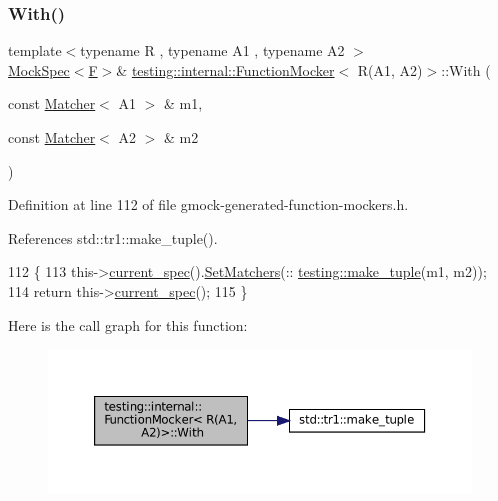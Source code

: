 \subsubsection{\texorpdfstring{With()}{With()}}
{\footnotesize\ttfamily template$<$typename R , typename A1 , typename A2 $>$ \\
\hyperlink{classtesting_1_1internal_1_1MockSpec}{Mock\+Spec}$<$\hyperlink{classtesting_1_1internal_1_1FunctionMocker_3_01R_07A1_00_01A2_08_4_a61302610bfc9b30588ea345e468310b2}{F}$>$\& \hyperlink{classtesting_1_1internal_1_1FunctionMocker}{testing\+::internal\+::\+Function\+Mocker}$<$ R(A1, A2)$>$\+::With (\begin{DoxyParamCaption}\item[{const \hyperlink{classtesting_1_1Matcher}{Matcher}$<$ A1 $>$ \&}]{m1,  }\item[{const \hyperlink{classtesting_1_1Matcher}{Matcher}$<$ A2 $>$ \&}]{m2 }\end{DoxyParamCaption})\hspace{0.3cm}{\ttfamily [inline]}}



Definition at line 112 of file gmock-\/generated-\/function-\/mockers.\+h.



References std\+::tr1\+::make\+\_\+tuple().


\begin{DoxyCode}
112                                                                   \{
113     this->\hyperlink{classtesting_1_1internal_1_1FunctionMockerBase_a744318106e20b346f4f1efbf5a601644}{current\_spec}().\hyperlink{classtesting_1_1internal_1_1MockSpec_a6b4fd303136c6282b19ddb16100f02a2}{SetMatchers}(::
      \hyperlink{namespacestd_1_1tr1_af7e12a0f5b5791b5b7c49a5a17b85359}{testing::make\_tuple}(m1, m2));
114     \textcolor{keywordflow}{return} this->\hyperlink{classtesting_1_1internal_1_1FunctionMockerBase_a744318106e20b346f4f1efbf5a601644}{current\_spec}();
115   \}
\end{DoxyCode}
Here is the call graph for this function\+:
\nopagebreak
\begin{figure}[H]
\begin{center}
\leavevmode
\includegraphics[width=350pt]{classtesting_1_1internal_1_1FunctionMocker_3_01R_07A1_00_01A2_08_4_a7e17361fadc89120c1254826baa3200e_cgraph}
\end{center}
\end{figure}


